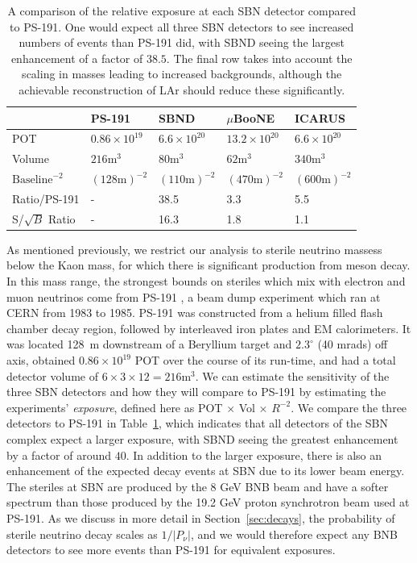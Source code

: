 \documentclass[11pt, a4paper]{article}
\newcommand{\refsec}[1]{Section~\ref{#1}}
\newcommand{\reftab}[1]{Table~\ref{#1}}
\begin{document}
\begin{table}[t!]
\centering
\begin{tabular}{| l || l | l | l | l |}
	\hline
	& PS-191 & SBND & $\mu$BooNE & ICARUS \\ \hline \hline
	POT	& $0.86 \times 10^{19}$	& $6.6 \times 10^{20}$	&	$13.2 \times 10^{20}$     &  $6.6 \times 10^{20}$ \\ \hline
	Volume	& $216\text{m}^3$	&	$80\text{m}^3$	&	$62\text{m}^3$	     &   $340\text{m}^3$	\\ \hline
	$\text{Baseline}^{-2}$	& $(128 	\text{m} )^{-2}$	&$(110 \text{m} )^{-2}$	&	$(470 \text{m} )^{-2}$			     & $(600 \text{m} )^{-2}$	  \\ \hline
Ratio/PS-191 & - 	& 38.5 	& 3.3	& 5.5\\ \hline
	S/$\sqrt{B}$ Ratio & - 	& 16.3 	& 1.8	& 1.1\\ \hline
\end{tabular}

\caption{\label{tab:exposure} A comparison of the relative exposure at each SBN detector
compared to PS-191. One would expect all  three SBN detectors to see increased
numbers of events than PS-191 did, with SBND seeing the largest enhancement of a
factor of $38.5$. The final row takes into account the scaling in masses
leading to increased backgrounds, although the achievable reconstruction of LAr
should reduce these significantly.}

\end{table}

As mentioned previously, we restrict our analysis to sterile neutrino massess
below the Kaon mass, for which there is significant production from meson
decay. In this mass range, the strongest bounds on steriles which mix with
electron and muon neutrinos come from PS-191 \cite{Bernardi:1985ny,
Bernardi:1987ek}, a beam dump experiment which ran at CERN from 1983 to 1985. 
%
PS-191 was constructed from a helium filled flash chamber decay region,
followed by interleaved iron plates and EM calorimeters. It was located 128~m
downstream of a Beryllium target and $2.3^\circ$ (40 mrads) off axis, obtained
$0.86 \times 10^{19}$ POT over the course of its run-time, and had a total
detector volume of $6\times3\times12 = 216 \text{m}^3$. We can estimate the
sensitivity of the three SBN detectors and how they will compare to PS-191 by
estimating the experiments' \emph{exposure}, defined here as POT $\times$ Vol
$\times$ $R^{-2}$. We compare the three detectors to PS-191 in
\reftab{tab:exposure}, which indicates that all detectors of the SBN complex
expect a larger exposure, with SBND seeing the greatest enhancement by a factor
of around $40$. 
%
In addition to the larger exposure, there is also an enhancement of the
expected decay events at SBN due to its lower beam energy. The steriles at SBN
are produced by the 8 GeV BNB beam and have a softer spectrum than those
produced by the 19.2 GeV proton synchrotron beam used at PS-191. As we discuss
in more detail in \refsec{sec:decays}, the probability of sterile neutrino
decay scales as $1/|P_\nu|$, and we would therefore expect any BNB detectors to
see more events than PS-191 for equivalent exposures.
\end{document}
